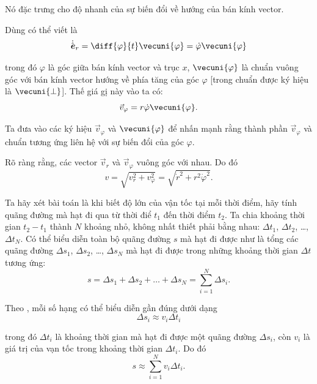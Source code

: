 \noindent
Nó đặc trưng cho độ nhanh của sự biến đổi về hướng của bán kính vector.

Dùng  có thể viết là
\begin{equation*}
\dot{\hat{\boldsymbol{e}}}_r = \diff{\varphi}{t}\vecuni{\varphi} = \dot{\varphi}\vecuni{\varphi}
\end{equation*}

\noindent
trong đó $\varphi$ là góc giữa bán kính vector và trục $x$, $\vecuni{\varphi}$ là chuẩn vuông góc với bán kính vector hướng về phía tăng của góc $\varphi$ [trong  chuẩn được ký hiệu là $\vecuni{\perp}$]. Thế giá gị này vào  ta có:
\begin{equation}\label{eq:1_71}
\vec{v}_{\varphi} = r\dot{\varphi}\vecuni{\varphi}.
\end{equation}

\noindent
Ta đưa vào các ký hiệu $\vec{v}_{\varphi}$ và $\vecuni{\varphi}$ để nhấn mạnh rằng thành phần $\vec{v}_{\varphi}$ và chuẩn tương ứng liên hệ với sự biến đổi của góc $\varphi$.

Rõ ràng rằng, các vector $\vec{v}_r$ và $\vec{v}_{\varphi}$ vuông góc với nhau. Do đó
\begin{equation}\label{eq:1_72}
v = \sqrt{v_r^2 + v_{\varphi}^2} = \sqrt{\dot{r}^2 + r^2\dot{\varphi}^2}.
\end{equation}

Ta hãy xét bài toán là khi biết độ lớn của vận tốc tại mỗi thời điểm, hãy tính quãng đường mà hạt đi qua từ thời điể $t_1$ đến thời điểm $t_2$. Ta chia khoảng thời gian $t_2-t_1$ thành $N$ khoảng nhỏ, không nhất thiết phải bằng nhau: $\Delta t_1$, $\Delta t_2$, \ldots, $\Delta t_N$. Có thể biểu diễn toàn bộ quãng đường $s$ mà hạt đi được như là tổng các quãng đường $\Delta s_1$, $\Delta s_2$, \ldots, $\Delta s_N$ mà hạt đi được trong những khoảng thời gian $\Delta t$ tương ứng:
\begin{equation*}
s = \Delta s_1 + \Delta s_2 + \ldots + \Delta s_N = \sum_{i=1}^{N} \Delta s_i.
\end{equation*}

\noindent
Theo , mỗi số hạng có thể biểu diễn gần đúng dưới dạng
\begin{equation*}
\Delta s_i \approx v_i \Delta t_i
\end{equation*}

\noindent
trong đó $\Delta t_i$ là khoảng thời gian mà hạt đi được một quãng đường $\Delta s_i$, còn $v_i$ là giá trị của vạn tốc trong khoảng thời gian $\Delta t_i$. Do đó
\begin{equation}\label{eq:1_73}
s \approx \sum_{i=1}^{N} v_i \Delta t_i.
\end{equation}


